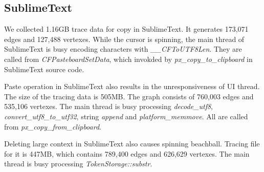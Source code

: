 \subsection{SublimeText}

We collected 1.16GB trace data for copy in SublimeText. It generates 173,071
edges and 127,488 vertexes. While the cursor is spinning, the main thread
of SublimeText is busy encoding characters with \textit{\_\_CFToUTF8Len}.
They are called from \textit{CFPasteboardSetData}, which invokded by
\textit{px\_copy\_to\_clipboard} in SublimeText source code.

Paste operation in SublimeText also results in the unresponsiveness of
UI thread. The size of the tracing data is 505MB. The graph consists of
760,003 edges and 535,106 vertexes. The main thread is busy processing
\textit{decode\_utf8}, \textit{convert\_utf8\_to\_utf32}, string
\textit{append} and \textit{platform\_memmove}. All are called from
\textit{px\_copy\_from\_clipboard}.

Deleting large context in SublimeText also causes spinning beachball. Tracing
file for it is 447MB, which contains 789,400 edges and 626,629 vertexes. The
main thread is busy processing \textit{TokenStorage::substr}.
